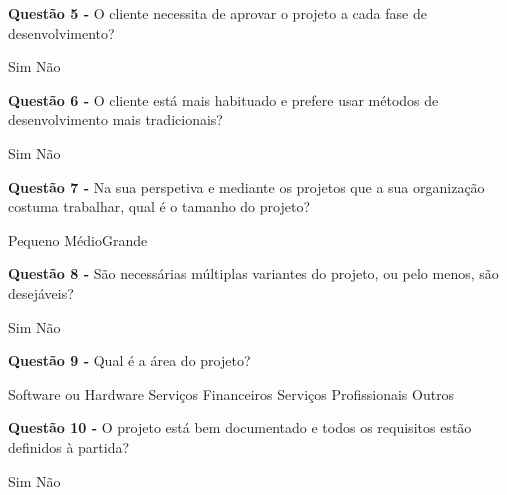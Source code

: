 \begin{framed}
\vspace{2mm}
\newline\textbf{Questão 5 - } O cliente necessita de aprovar o projeto a cada fase de desenvolvimento?
\newline \begin{center} Sim \hspace{30mm} Não \end{center}
\vspace{2mm}
\newline\textbf{Questão 6 - } O cliente está mais habituado e prefere usar métodos de desenvolvimento mais tradicionais?
\newline \begin{center} Sim  \hspace{30mm} Não\end{center}
\newline\textbf{Questão 7 - } Na sua perspetiva e mediante os projetos que a sua organização costuma trabalhar, qual é o tamanho do projeto?
\newline \begin{center} Pequeno \hspace{17mm} Médio\hspace{17mm}Grande\end{center}
\vspace{2mm}
\newline\textbf{Questão 8 - } São necessárias múltiplas variantes do projeto, ou pelo menos, são desejáveis?
\newline \begin{center} Sim\hspace{30mm} Não\end{center}
\vspace{2mm}
\newline\textbf{Questão 9 - } Qual é a área do projeto?
\newline \begin{center} Software ou Hardware \hspace{17mm} Serviços Financeiros \hspace{17mm}Serviços Profissionais \hspace{17mm} Outros\end{center}
\vspace{2mm}
\newline\textbf{Questão 10 - } O projeto está bem documentado e todos os requisitos estão definidos à partida?
\newline \begin{center} Sim \hspace{30mm} Não\end{center}

\end{framed}

